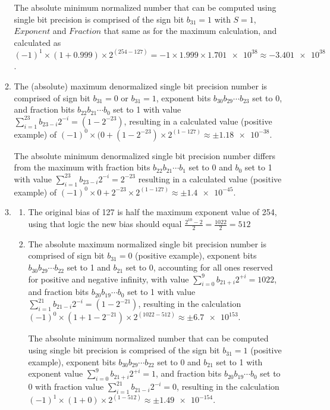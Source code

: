 \documentclass[main.tex]{subfiles}
\begin{document}
\begin{enumerate}
\begin{enumerate}
    The absolute minimum normalized number that can be computed using single bit precision is comprised of the sign bit $b_{31} = 1$ with $S=1$, $Exponent$ and $Fraction$ that same as for the maximum calculation, and calculated as $(-1)^1 \times (1+0.999) \times 2^{(254-127)} = -1 \times 1.999 \times \num{1.701e38} \approx \num{-3.401e38}$.
    
    \item The (absolute) maximum denormalized single bit precision number is comprised of sign bit $b_{31} = 0$ or $b_{31} = 1$, exponent bits $b_{30} b_{29} \cdots b_{23}$ set to 0, and fraction bits $b_{22} b_{21} \cdots b_{0}$ set to 1 with value $\sum_{i=1}^{23} b_{23-i} 2^{-i} = (1-2^{-23})$, resulting in a calculated value (positive example) of $(-1)^0 \times (0+(1-2^{-23}) \times 2^{(1-127)} \approx \pm\num{1.18e-38}$. 
    
    The absolute minimum denormalized single bit precision number differs from the maximum with fraction bits $b_{22} b_{21} \cdots b_{1}$ set to 0 and $b_{0}$ set to 1 with value $\sum_{i=1}^{23} b_{23-i} 2^{-i} = 2^{-23}$ resulting in a calculated value (positive example) of $(-1)^0 \times 0+2^{-23} \times 2^{(1-127)} \approx \pm\num{1.4e-45}$.
    
    \item 
    \begin{enumerate}
        \item The original bias of 127 is half the maximum exponent value of 254, using that logic the new bias should equal $\frac{2^{10} - 2}{2} = \frac{1022}{2}=512$ 
        
        \item The absolute maximum normalized single bit precision number is comprised of sign bit $b_{31} = 0$ (positive example), exponent bits $b_{30} b_{29} \cdots b_{22}$ set to 1 and $b_{21}$ set to 0, accounting for all ones reserved for positive and negative infinity, with value $\sum_{i=0}^{9} b_{21+i} 2^{+i} = 1022$, and fraction bits $b_{20} b_{19} \cdots b_{0}$ set to 1 with value $\sum_{i=1}^{21} b_{21-i} 2^{-i} = (1-2^{-21})$, resulting in the calculation $(-1)^0 \times (1+1-2^{-21}) \times 2^{(1022-512)} \approx \pm \num{6.7e153}$. 
        
        The absolute minimum normalized number that can be computed using single bit precision is comprised of the sign bit $b_{31} = 1$ (positive example), exponent bits $b_{30} b_{29} \cdots b_{22}$ set to 0 and $b_{21}$ set to 1 with exponent value $\sum_{i=0}^{9} b_{21+i} 2^{+i} = 1$, and fraction bits $b_{20} b_{19} \cdots b_{0}$ set to 0 with fraction value $\sum_{i=1}^{21} b_{21-i} 2^{-i} = 0$, resulting in the calculation  $(-1)^1 \times (1+0) \times 2^{(1-512)} \approx \pm \num{1.49e-154}$.
        

\end{enumerate}
\end{enumerate}
\end{enumerate}
\end{document}
